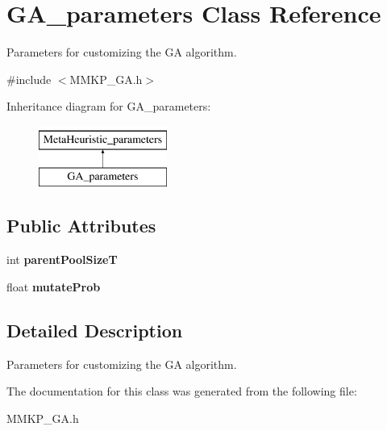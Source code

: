 \hypertarget{class_g_a__parameters}{\section{G\+A\+\_\+parameters Class Reference}
\label{class_g_a__parameters}
}


Parameters for customizing the G\+A algorithm.  




{\ttfamily \#include $<$M\+M\+K\+P\+\_\+\+G\+A.\+h$>$}

Inheritance diagram for G\+A\+\_\+parameters\+:\begin{figure}[H]
\begin{center}
\leavevmode
\includegraphics[height=2.000000cm]{class_g_a__parameters}
\end{center}
\end{figure}
\subsection*{Public Attributes}
\begin{DoxyCompactItemize}
\item 
\hypertarget{class_g_a__parameters_a7f9ca7933fffb885b570612ea3d027cf}{int {\bfseries parent\+Pool\+Size\+T}}\label{class_g_a__parameters_a7f9ca7933fffb885b570612ea3d027cf}

\item 
\hypertarget{class_g_a__parameters_a0d12cea2fb85ba1e3170dbc0b6c23a2e}{float {\bfseries mutate\+Prob}}\label{class_g_a__parameters_a0d12cea2fb85ba1e3170dbc0b6c23a2e}

\end{DoxyCompactItemize}


\subsection{Detailed Description}
Parameters for customizing the G\+A algorithm. 

The documentation for this class was generated from the following file\+:\begin{DoxyCompactItemize}
\item 
M\+M\+K\+P\+\_\+\+G\+A.\+h\end{DoxyCompactItemize}
